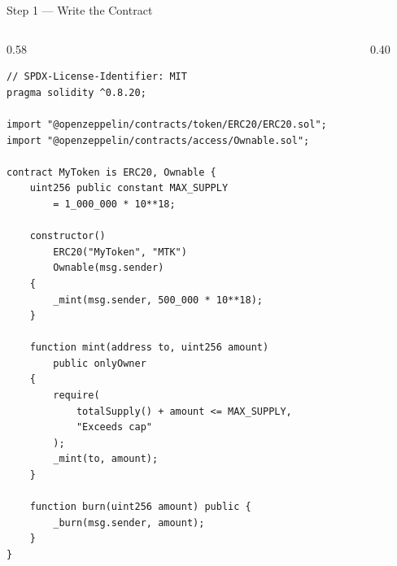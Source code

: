 \documentclass[8pt,aspectratio=169]{beamer}
\begin{document}
\begin{frame}[fragile]{Step 1 --- Write the Contract}
\vspace{-2mm}
\begin{columns}[T]
\begin{column}{0.58\linewidth}
\begin{lstlisting}[basicstyle=\ttfamily\tiny,xleftmargin=0pt,xrightmargin=0pt,linewidth=\linewidth]
// SPDX-License-Identifier: MIT
pragma solidity ^0.8.20;

import "@openzeppelin/contracts/token/ERC20/ERC20.sol";
import "@openzeppelin/contracts/access/Ownable.sol";

contract MyToken is ERC20, Ownable {
    uint256 public constant MAX_SUPPLY
        = 1_000_000 * 10**18;

    constructor()
        ERC20("MyToken", "MTK")
        Ownable(msg.sender)
    {
        _mint(msg.sender, 500_000 * 10**18);
    }

    function mint(address to, uint256 amount)
        public onlyOwner
    {
        require(
            totalSupply() + amount <= MAX_SUPPLY,
            "Exceeds cap"
        );
        _mint(to, amount);
    }

    function burn(uint256 amount) public {
        _burn(msg.sender, amount);
    }
}
\end{lstlisting}
\end{column}
\begin{column}{0.40\linewidth}
\end{column}
\end{columns}
\end{frame}
\end{document}
